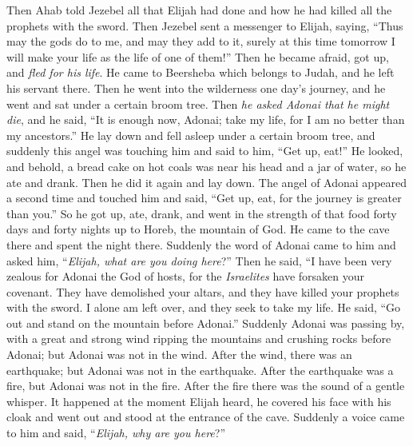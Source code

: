 \begin{biblechapter} %
 Then Ahab told Jezebel all that Elijah had done and how he had killed all the prophets with the sword.
\verse Then Jezebel sent a messenger to Elijah, saying, “Thus may the gods do to me, and may they add to it, surely at this time tomorrow I will make your life as the life of one of them!”
\verse Then he became afraid, got up, and \textit{fled for his life}. He came to Beersheba which belongs to Judah, and he left his servant there.
\verse Then he went into the wilderness one day’s journey, and he went and sat under a certain broom tree. Then \textit{he asked Adonai that he might die}, and he said, “It is enough now, Adonai; take my life, for I am no better than my ancestors.”
\verse He lay down and fell asleep under a certain broom tree, and suddenly this angel was touching him and said to him, “Get up, eat!”
\verse He looked, and behold, a bread cake on hot coals was near his head and a jar of water, so he ate and drank. Then he did it again and lay down.
\verse The angel of Adonai appeared a second time and touched him and said, “Get up, eat, for the journey is greater than you.”
\verse So he got up, ate, drank, and went in the strength of that food forty days and forty nights up to Horeb, the mountain of God.
 He came to the cave there and spent the night there. Suddenly the word of Adonai came to him and asked him, “\textit{Elijah, what are you doing here}?”
\verse Then he said, “I have been very zealous for Adonai the God of hosts, for the \textit{Israelites} have forsaken your covenant. They have demolished your altars, and they have killed your prophets with the sword. I alone am left over, and they seek to take my life.
\verse He said, “Go out and stand on the mountain before Adonai.” Suddenly Adonai was passing by, with a great and strong wind ripping the mountains and crushing rocks before Adonai; but Adonai was not in the wind. After the wind, there was an earthquake; but Adonai was not in the earthquake.
\verse After the earthquake was a fire, but Adonai was not in the fire. After the fire there was the sound of a gentle whisper.
\verse It happened at the moment Elijah heard, he covered his face with his cloak and went out and stood at the entrance of the cave. Suddenly a voice came to him and said, “\textit{Elijah, why are you here}?”

\end{biblechapter}
